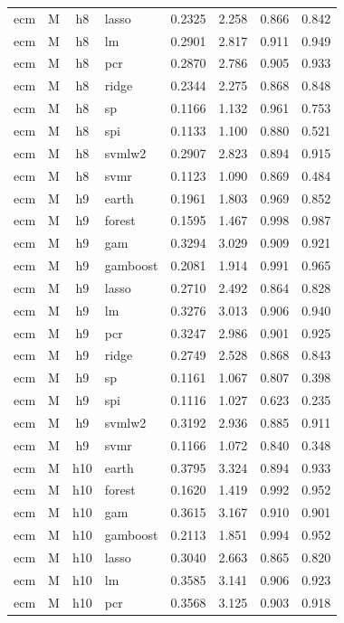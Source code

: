 \begin{ThreePartTable}
\begin{longtable}[t]{llclcccc}
ecm & M & h8 & lasso & 0.2325 & 2.258 & 0.866 & 0.842\\
ecm & M & h8 & lm & 0.2901 & 2.817 & 0.911 & 0.949\\
ecm & M & h8 & pcr & 0.2870 & 2.786 & 0.905 & 0.933\\
ecm & M & h8 & ridge & 0.2344 & 2.275 & 0.868 & 0.848\\
ecm & M & h8 & sp & 0.1166 & 1.132 & 0.961 & 0.753\\
ecm & M & h8 & spi & 0.1133 & 1.100 & 0.880 & 0.521\\
ecm & M & h8 & svmlw2 & 0.2907 & 2.823 & 0.894 & 0.915\\
ecm & M & h8 & svmr & 0.1123 & 1.090 & 0.869 & 0.484\\
\addlinespace
ecm & M & h9 & earth & 0.1961 & 1.803 & 0.969 & 0.852\\
ecm & M & h9 & forest & 0.1595 & 1.467 & 0.998 & 0.987\\
ecm & M & h9 & gam & 0.3294 & 3.029 & 0.909 & 0.921\\
ecm & M & h9 & gamboost & 0.2081 & 1.914 & 0.991 & 0.965\\
ecm & M & h9 & lasso & 0.2710 & 2.492 & 0.864 & 0.828\\
ecm & M & h9 & lm & 0.3276 & 3.013 & 0.906 & 0.940\\
ecm & M & h9 & pcr & 0.3247 & 2.986 & 0.901 & 0.925\\
ecm & M & h9 & ridge & 0.2749 & 2.528 & 0.868 & 0.843\\
ecm & M & h9 & sp & 0.1161 & 1.067 & 0.807 & 0.398\\
ecm & M & h9 & spi & 0.1116 & 1.027 & 0.623 & 0.235\\
ecm & M & h9 & svmlw2 & 0.3192 & 2.936 & 0.885 & 0.911\\
ecm & M & h9 & svmr & 0.1166 & 1.072 & 0.840 & 0.348\\
\addlinespace
ecm & M & h10 & earth & 0.3795 & 3.324 & 0.894 & 0.933\\
ecm & M & h10 & forest & 0.1620 & 1.419 & 0.992 & 0.952\\
ecm & M & h10 & gam & 0.3615 & 3.167 & 0.910 & 0.901\\
ecm & M & h10 & gamboost & 0.2113 & 1.851 & 0.994 & 0.952\\
ecm & M & h10 & lasso & 0.3040 & 2.663 & 0.865 & 0.820\\
ecm & M & h10 & lm & 0.3585 & 3.141 & 0.906 & 0.923\\
ecm & M & h10 & pcr & 0.3568 & 3.125 & 0.903 & 0.918\\

\end{longtable}
\end{ThreePartTable}
